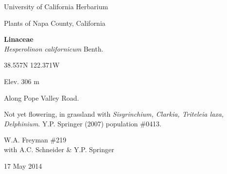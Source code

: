\documentclass[letterpaper,10pt]{article}
\begin{document}
\begin{minipage}[t]{0.40\textwidth}

\begin{center}
University of California Herbarium \\
\begin{large}
Plants of Napa County, California \\
\end{large}
\vspace{\baselineskip}
\textbf{Linaceae} \\
\textit{Hesperolinon californicum} Benth.\\
\end{center}

\begin{footnotesize}

\begin{multicols}{2}
38.557\textdegree N 122.371\textdegree W
\columnbreak
\begin{flushright}
Elev. 306 m
\end{flushright}
\end{multicols}

Along Pope Valley Road.
\vspace{\baselineskip}

Not yet flowering, in grassland with \textit{Sisyrinchium, Clarkia, Triteleia laxa, Delphinium}. Y.P. Springer (2007) population \#0413.

\begin{multicols}{2}
W.A. Freyman \#219 \\
with A.C. Schneider \& Y.P. Springer
\columnbreak
\begin{flushright}
17 May 2014
\end{flushright}
\end{multicols}

\end{footnotesize}

\end{minipage}

\vspace{2cm}
%
%

%
%
\end{document}
